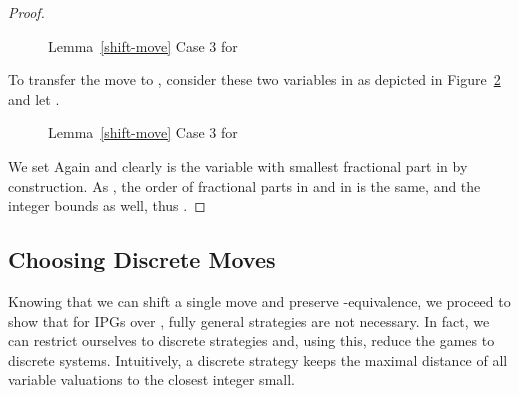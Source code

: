 \documentclass[fleqn,envcountsame]{LMCS}
\begin{document}
\begin{proof}
\begin{figure}[h]
\begin{center}
\end{center}
\caption{Lemma~\ref{shift-move} Case 3 for }
\label{fig-case-3-s}
\end{figure}

  To transfer the move to , consider these two variables in  as
  depicted in Figure~\ref{fig-case-3-sprime} and let
  .

\begin{figure}[h]
\begin{center}
\end{center}
\caption{Lemma~\ref{shift-move} Case 3 for }
\label{fig-case-3-sprime}
\end{figure}

  We set 
  Again  and clearly  is the variable with smallest fractional
  part in  by construction. As , the order of fractional
  parts in  and in  is the same, and the integer bounds as well,
  thus .
\end{proof}


\subsection{Choosing Discrete Moves}\label{subsec_choose}

Knowing that we can shift a single move and preserve -equivalence,
we proceed to show that for IPGs over , fully general strategies are
not necessary. In fact, we can restrict ourselves to discrete strategies
and, using this, reduce the games to discrete systems.
Intuitively, a discrete strategy keeps the maximal distance of 
all variable valuations to the closest integer small.
\end{document}
